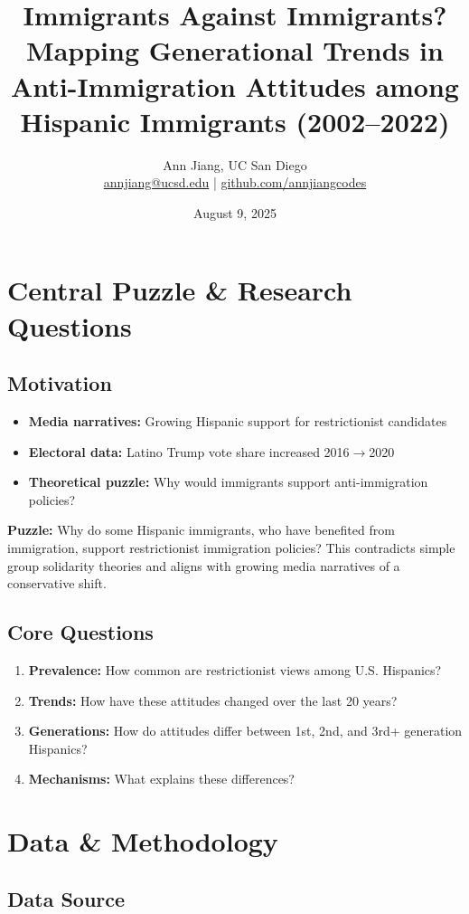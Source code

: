 \documentclass[11pt,letterpaper]{article}
\title{\textbf{Immigrants Against Immigrants?}\\
\large Mapping Generational Trends in Anti-Immigration Attitudes among Hispanic Immigrants (2002--2022)}
\author{Ann Jiang, UC San Diego\\
\href{mailto:annjiang@ucsd.edu}{annjiang@ucsd.edu} | \href{https://github.com/annjiangcodes}{github.com/annjiangcodes}}
\date{August 9, 2025}
\newcommand{\compactdesc}[2]{\item \textbf{#1:} #2}
\begin{document}
\maketitle

\section{Central Puzzle \& Research Questions}

\subsection{Motivation}
\begin{itemize}
    \compactdesc{Media narratives}{Growing Hispanic support for restrictionist candidates}
    \compactdesc{Electoral data}{Latino Trump vote share increased 2016$\rightarrow$2020}
    \compactdesc{Theoretical puzzle}{Why would immigrants support anti-immigration policies?}
\end{itemize}

\textbf{Puzzle:} Why do some Hispanic immigrants, who have benefited from immigration, support restrictionist immigration policies? This contradicts simple group solidarity theories and aligns with growing media narratives of a conservative shift.

\subsection{Core Questions}
\begin{enumerate}
    \item \textbf{Prevalence:} How common are restrictionist views among U.S. Hispanics?
    \item \textbf{Trends:} How have these attitudes changed over the last 20 years?
    \item \textbf{Generations:} How do attitudes differ between 1st, 2nd, and 3rd+ generation Hispanics?
    \item \textbf{Mechanisms:} What explains these differences?
\end{enumerate}

\section{Data \& Methodology}

\subsection{Data Source}
\end{document}
